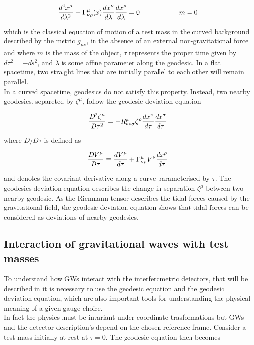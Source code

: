 \documentclass[binding=0.6cm, LaM]{sapthesis}
\begin{document}
		\begin{equation}
		{{d^2x^{\mu}}\over{d\lambda^2}} + \Gamma_{\nu\rho}^{\mu}(x){{dx^{\nu}}\over{d\lambda}}{{dx^{\rho}}\over{d\lambda}} = 0 \hspace*{2cm} m = 0
		\end{equation}

	which is the classical equation of motion of a test mass in the curved background described 
	by the metric $g_{\mu\nu}$, in the absence of an external non-gravitational force and where $m$ is the mass
	of the object, $\tau$ represents the proper time given by $d\tau^2 = -ds^2$, 
	and $\lambda$ is some affine parameter along the geodesic.
	In a flat spacetime, two straight lines that are initially parallel to each other will remain parallel. \\
	In a curved spacetime, geodesics do not satisfy this property.
	Instead, two nearby geodesics, separeted by $\zeta^{\mu}$, follow the geodesic deviation equation
		
		\begin{equation}
		{{D^2\zeta^{\mu}}\over{D\tau^2}} = -R^{\mu}_{\nu\rho\sigma}\zeta^{\rho}{{dx^{\nu}}\over{d\tau}}{{dx^{\sigma}}\over{d\tau}}
		\end{equation}

	where $D/D\tau$ is defined as

		\begin{equation}
		{{DV^{\mu}}\over{D\tau}} \equiv {{dV^{\mu}}\over{d\tau}} + \Gamma^{\mu}_{\nu\rho}V^{\nu}{{dx^{\rho}}\over{d\tau}}
		\end{equation}

	and denotes the covariant derivative along a curve parameterised by $\tau$. 
	The geodesics deviation equation describes the change in separation $\zeta^{\mu}$ between two nearby geodesic.
	As the Rienmann tensor describes the tidal forces caused by the gravitational field, 
	the geodesic deviation equation shows that tidal forces can be considered as deviations of nearby geodesics.

\subsection{Interaction of gravitational waves with test masses}

	To understand how GWs interact with the interferometric detectors, that will be described in %
	it is necessary to use the geodesic equation and the geodesic deviation equation, which are also important tools 
	for understanding the physical meaning of a given gauge choice. \\
	In fact the physics must be invariant under coordinate trasformations but GWs and the detector description's depend on the chosen reference frame.
	Consider a test mass initially at rest at $\tau = 0$. The geodesic equation then becomes
\end{document}
